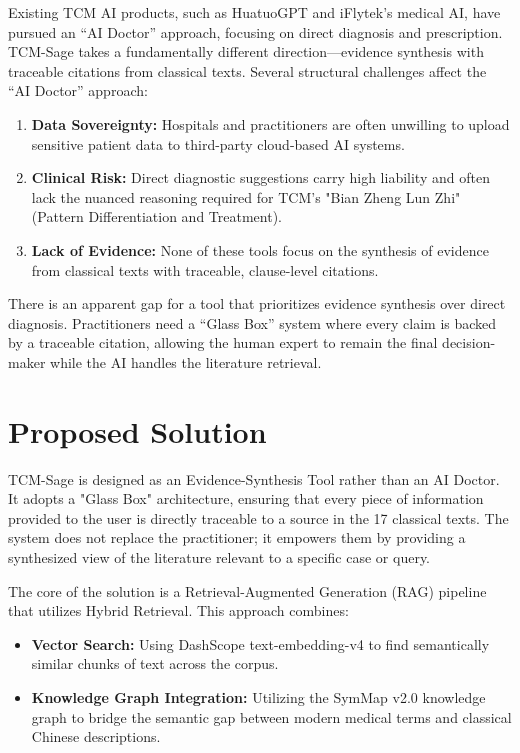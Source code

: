 \documentclass[11pt,a4paper]{report}
\begin{document}
Existing TCM AI products, such as HuatuoGPT and iFlytek's medical AI, have pursued an ``AI Doctor'' approach, focusing on direct diagnosis and prescription. TCM-Sage takes a fundamentally different direction---evidence synthesis with traceable citations from classical texts. Several structural challenges affect the ``AI Doctor'' approach:
\begin{enumerate}
    \item \textbf{Data Sovereignty:} Hospitals and practitioners are often unwilling to upload sensitive patient data to third-party cloud-based AI systems.
    \item \textbf{Clinical Risk:} Direct diagnostic suggestions carry high liability and often lack the nuanced reasoning required for TCM's "Bian Zheng Lun Zhi" (Pattern Differentiation and Treatment).
    \item \textbf{Lack of Evidence:} None of these tools focus on the synthesis of evidence from classical texts with traceable, clause-level citations.
\end{enumerate}

There is an apparent gap for a tool that prioritizes evidence synthesis over direct diagnosis. Practitioners need a ``Glass Box'' system where every claim is backed by a traceable citation, allowing the human expert to remain the final decision-maker while the AI handles the literature retrieval.

\section{Proposed Solution}
TCM-Sage is designed as an Evidence-Synthesis Tool rather than an AI Doctor. It adopts a "Glass Box" architecture, ensuring that every piece of information provided to the user is directly traceable to a source in the 17 classical texts. The system does not replace the practitioner; it empowers them by providing a synthesized view of the literature relevant to a specific case or query.

The core of the solution is a Retrieval-Augmented Generation (RAG) pipeline that utilizes Hybrid Retrieval. This approach combines:
\begin{itemize}
    \item \textbf{Vector Search:} Using DashScope text-embedding-v4 to find semantically similar chunks of text across the corpus.
    \item \textbf{Knowledge Graph Integration:} Utilizing the SymMap v2.0 knowledge graph to bridge the semantic gap between modern medical terms and classical Chinese descriptions.
\end{itemize}
\end{document}
